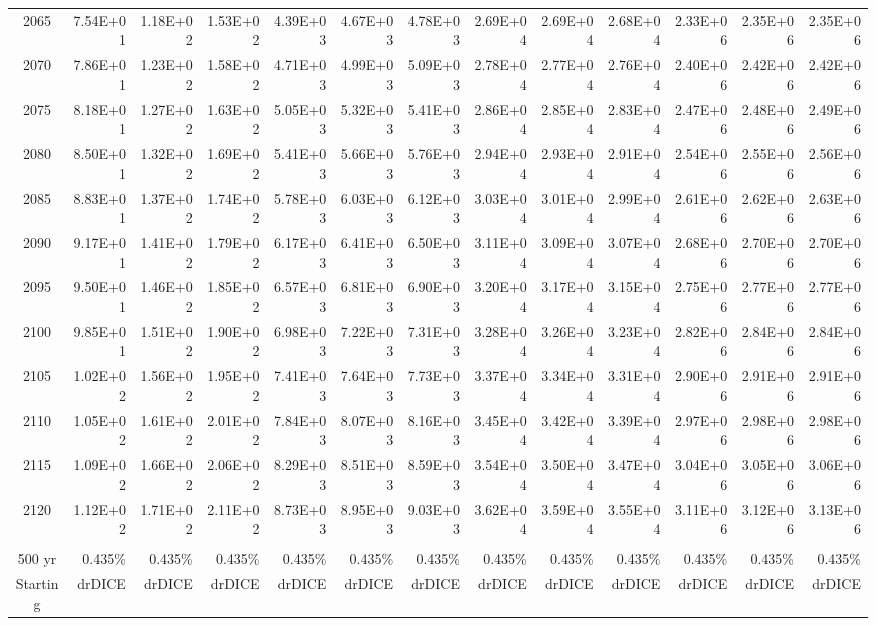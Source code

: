 \documentclass{article}
\begin{document}
\begin{table}
\begin{tabular}{crrr|rrr|rrr|rrr}
2065     & 7.54E+01 & 1.18E+02 & 1.53E+02 & 4.39E+03 & 4.67E+03 & 4.78E+03 & 2.69E+04 & 2.69E+04 & 2.68E+04 & 2.33E+06 & 2.35E+06 & 2.35E+06 \\
2070     & 7.86E+01 & 1.23E+02 & 1.58E+02 & 4.71E+03 & 4.99E+03 & 5.09E+03 & 2.78E+04 & 2.77E+04 & 2.76E+04 & 2.40E+06 & 2.42E+06 & 2.42E+06 \\
2075     & 8.18E+01 & 1.27E+02 & 1.63E+02 & 5.05E+03 & 5.32E+03 & 5.41E+03 & 2.86E+04 & 2.85E+04 & 2.83E+04 & 2.47E+06 & 2.48E+06 & 2.49E+06 \\
2080     & 8.50E+01 & 1.32E+02 & 1.69E+02 & 5.41E+03 & 5.66E+03 & 5.76E+03 & 2.94E+04 & 2.93E+04 & 2.91E+04 & 2.54E+06 & 2.55E+06 & 2.56E+06 \\
2085     & 8.83E+01 & 1.37E+02 & 1.74E+02 & 5.78E+03 & 6.03E+03 & 6.12E+03 & 3.03E+04 & 3.01E+04 & 2.99E+04 & 2.61E+06 & 2.62E+06 & 2.63E+06 \\
2090     & 9.17E+01 & 1.41E+02 & 1.79E+02 & 6.17E+03 & 6.41E+03 & 6.50E+03 & 3.11E+04 & 3.09E+04 & 3.07E+04 & 2.68E+06 & 2.70E+06 & 2.70E+06 \\
2095     & 9.50E+01 & 1.46E+02 & 1.85E+02 & 6.57E+03 & 6.81E+03 & 6.90E+03 & 3.20E+04 & 3.17E+04 & 3.15E+04 & 2.75E+06 & 2.77E+06 & 2.77E+06 \\
2100     & 9.85E+01 & 1.51E+02 & 1.90E+02 & 6.98E+03 & 7.22E+03 & 7.31E+03 & 3.28E+04 & 3.26E+04 & 3.23E+04 & 2.82E+06 & 2.84E+06 & 2.84E+06 \\
2105     & 1.02E+02 & 1.56E+02 & 1.95E+02 & 7.41E+03 & 7.64E+03 & 7.73E+03 & 3.37E+04 & 3.34E+04 & 3.31E+04 & 2.90E+06 & 2.91E+06 & 2.91E+06 \\
2110     & 1.05E+02 & 1.61E+02 & 2.01E+02 & 7.84E+03 & 8.07E+03 & 8.16E+03 & 3.45E+04 & 3.42E+04 & 3.39E+04 & 2.97E+06 & 2.98E+06 & 2.98E+06 \\
2115     & 1.09E+02 & 1.66E+02 & 2.06E+02 & 8.29E+03 & 8.51E+03 & 8.59E+03 & 3.54E+04 & 3.50E+04 & 3.47E+04 & 3.04E+06 & 3.05E+06 & 3.06E+06 \\
2120     & 1.12E+02 & 1.71E+02 & 2.11E+02 & 8.73E+03 & 8.95E+03 & 9.03E+03 & 3.62E+04 & 3.59E+04 & 3.55E+04 & 3.11E+06 & 3.12E+06 & 3.13E+06 \\
         &          &          &          &          &          &          &          &          &          &          &          &          \\ \hline
500 yr   & 0.435\%  & 0.435\%  & 0.435\%  & 0.435\%  & 0.435\%  & 0.435\%  & 0.435\%  & 0.435\%  & 0.435\%  & 0.435\%  & 0.435\%  & 0.435\%  \\
Starting & drDICE   & drDICE   & drDICE   & drDICE   & drDICE   & drDICE   & drDICE   & drDICE   & drDICE   & drDICE   & drDICE   & drDICE   \\

\end{tabular}
\end{table}
\end{document}
